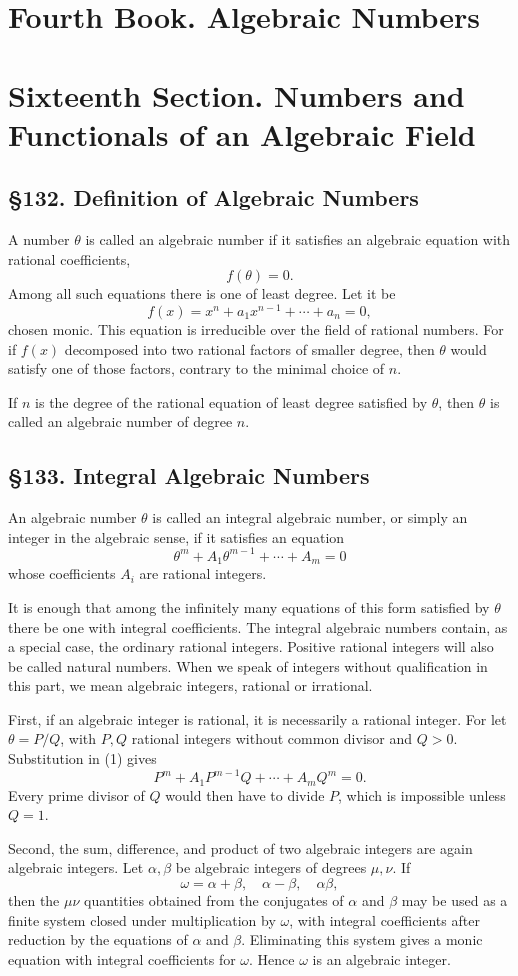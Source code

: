 \documentclass[11pt,a4paper]{book}
\newcommand{\webersection}[2]{\clearpage\section*{\S #1. #2}}
\newcommand{\booktitle}[1]{\clearpage\chapter*{#1}}
\begin{document}
\booktitle{Fourth Book. Algebraic Numbers}
\booktitle{Sixteenth Section. Numbers and Functionals of an Algebraic Field}

\webersection{132}{Definition of Algebraic Numbers}

A number \(\theta\) is called an algebraic number if it satisfies an algebraic equation with rational coefficients,
\begin{equation}
 f(\theta)=0. \tag{1}
\end{equation}
Among all such equations there is one of least degree.  Let it be
\begin{equation}
 f(x)=x^n+a_1x^{n-1}+\cdots+a_n=0, \tag{2}
\end{equation}
chosen monic.  This equation is irreducible over the field of rational numbers.  For if \(f(x)\) decomposed into two rational factors of smaller degree, then \(\theta\) would satisfy one of those factors, contrary to the minimal choice of \(n\).

If \(n\) is the degree of the rational equation of least degree satisfied by \(\theta\), then \(\theta\) is called an algebraic number of degree \(n\).

\webersection{133}{Integral Algebraic Numbers}

An algebraic number \(\theta\) is called an integral algebraic number, or simply an integer in the algebraic sense, if it satisfies an equation
\begin{equation}
 \theta^m+A_1\theta^{m-1}+\cdots+A_m=0 \tag{1}
\end{equation}
whose coefficients \(A_i\) are rational integers.

It is enough that among the infinitely many equations of this form satisfied by \(\theta\) there be one with integral coefficients.  The integral algebraic numbers contain, as a special case, the ordinary rational integers.  Positive rational integers will also be called natural numbers.  When we speak of integers without qualification in this part, we mean algebraic integers, rational or irrational.

First, if an algebraic integer is rational, it is necessarily a rational integer.  For let \(\theta=P/Q\), with \(P,Q\) rational integers without common divisor and \(Q>0\).  Substitution in (1) gives
\[
 P^m+A_1P^{m-1}Q+\cdots+A_mQ^m=0.
\]
Every prime divisor of \(Q\) would then have to divide \(P\), which is impossible unless \(Q=1\).

Second, the sum, difference, and product of two algebraic integers are again algebraic integers.  Let \(\alpha,\beta\) be algebraic integers of degrees \(\mu,\nu\).  If
\[
 \omega=\alpha+\beta,
\quad \alpha-\beta,
\quad \alpha\beta,
\]
then the \(\mu\nu\) quantities obtained from the conjugates of \(\alpha\) and \(\beta\) may be used as a finite system closed under multiplication by \(\omega\), with integral coefficients after reduction by the equations of \(\alpha\) and \(\beta\).  Eliminating this system gives a monic equation with integral coefficients for \(\omega\).  Hence \(\omega\) is an algebraic integer.
\end{document}
